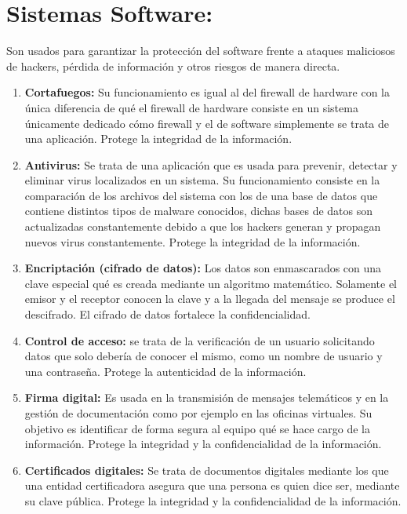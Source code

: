 \section{Sistemas Software:}
Son usados para garantizar la protección del software frente a ataques maliciosos de hackers, pérdida de información y otros riesgos de manera directa.
\begin{enumerate}
\item {\bfseries Cortafuegos:}
Su funcionamiento es igual al del firewall de hardware con la única diferencia de qué el firewall de hardware consiste en un sistema únicamente dedicado cómo firewall y el de software simplemente se trata de una aplicación. Protege la integridad de la información. 

\item {\bfseries Antivirus:}
Se trata de una aplicación que es usada para prevenir, detectar y eliminar virus localizados en un sistema. Su funcionamiento consiste en la comparación de los archivos del sistema con los de una base de datos que contiene distintos tipos de malware conocidos, dichas bases de datos son actualizadas constantemente debido a que los hackers generan y propagan nuevos virus constantemente. Protege la integridad de la información.\cite{antivirus}
\item {\bfseries Encriptación (cifrado de datos):}
Los datos son enmascarados con una clave especial qué es creada mediante un algoritmo matemático. Solamente el emisor y el receptor conocen la clave y a la llegada del mensaje se produce el descifrado. El cifrado de datos fortalece la confidencialidad. 
\item {\bfseries Control de acceso:}
se trata de la verificación de un usuario solicitando datos que solo debería de conocer el mismo, como un nombre de usuario y una contraseña. Protege la autenticidad de la información. 
\item {\bfseries Firma digital:}
Es usada en la transmisión de mensajes telemáticos y en la gestión de documentación como por ejemplo en las oficinas virtuales. Su objetivo es identificar de forma segura al equipo qué se hace cargo de la información. Protege la integridad y la confidencialidad de la información.
\item {\bfseries Certificados digitales:}
Se trata de documentos digitales mediante los que una entidad certificadora asegura que una persona es quien dice ser, mediante su clave pública. Protege la integridad y la confidencialidad de la información. \cite{certificado}

\end{enumerate}


